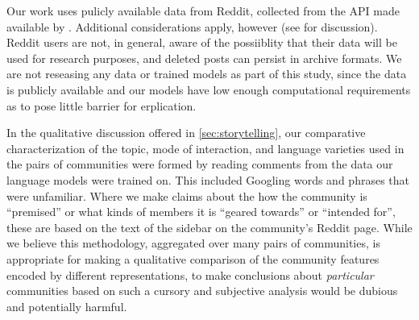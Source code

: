 \documentclass[11pt]{article}
\begin{document}
Our work uses pulicly available data from Reddit,
collected from the API made available by \citet{Baumgartner2020}.
Additional considerations apply, however 
(see \citet{Gliniecka2021} for discussion). Reddit users are not,
in general, aware of the possiiblity that their data will be used 
for research purposes, and deleted posts can persist in archive formats.
We are not reseasing any data or trained models as part of this study,
since the data is publicly available and our models have low enough
computational requirements as to pose little barrier for erplication.

In the qualitative discussion offered in \cref{sec:storytelling},
our comparative characterization of the topic, mode of interaction, 
and language varieties
used in the pairs of communities were formed by reading comments from the data our 
language models were trained on. This included Googling words and phrases that 
were unfamiliar. 
Where we make claims about the how the community is ``premised'' or what kinds of 
members it is ``geared towards'' or ``intended for'', these are based on the text
of the sidebar on the community's Reddit page.
While we believe this methodology, aggregated over many pairs of communities, 
is appropriate for making a qualitative comparison
of the community features encoded by different representations, 
to make conclusions about \emph{particular} communities based on such a cursory and
subjective analysis would be dubious and potentially harmful.





\end{document}
